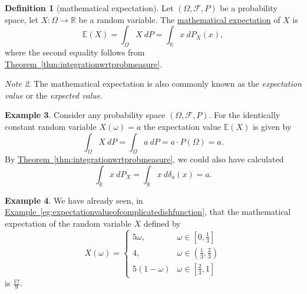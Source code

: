 \documentclass[a4paper,12pt]{scrreprt}
\newcommand{\R}{\mathbb{R}}
\newcommand{\defn}[1]{\ul{#1}}
\theoremstyle{definition}
\newtheorem{definition}{Definition}
\newtheorem{example}[definition]{Example}
\theoremstyle{plain}
\theoremstyle{remark}
\newtheorem{note}[definition]{Note}
\begin{document}
\begin{definition}[mathematical expectation]
  \label{def:mathematicalexpectation}
  Let $(\Omega,\mathcal{F}, P)$ be a probability space, let $X\colon \Omega \to \R$ be a random variable. The \defn{mathematical expectation} of $X$ is
  \begin{equation*}
    \mathbb{E}(X) = \int_{\Omega} X\ dP = \int_{\R} x\ dP_{X}(x),
  \end{equation*}
  where the second equality follows from \hyperref[thm:integrationwrtprobmeasure]{Theorem~\ref*{thm:integrationwrtprobmeasure}}.
\end{definition}

\begin{note}
  The mathematical expectation is also commonly known as the \emph{expectation value} or the \emph{expected value}.
\end{note}

\begin{example}
  Consider any probability space $(\Omega, \mathcal{F}, P)$. For the identically constant random variable $X(\omega) = a$ the expectation value $\mathbb{E}(X)$ is given by
  \begin{equation*}
    \int_{\Omega} X\ dP = \int_{\Omega} a\ dP = a\cdot P(\Omega) = a.
  \end{equation*}
  By \hyperref[thm:integrationwrtprobmeasure]{Theorem~\ref*{thm:integrationwrtprobmeasure}}, we could also have calculated
  \begin{equation*}
    \int_{\R} x\ dP_{X} = \int_{\R} x\ d\delta_{a}(x) = a.
  \end{equation*}
\end{example}

\begin{example}
  We have already seen, in \hyperref[eg:expectationvalueofcomplicatedishfunction]{Example~\ref*{eg:expectationvalueofcomplicatedishfunction}}, that the mathematical expectation of the random variable $X$ defined by
  \begin{equation*}
    X(\omega) =
    \begin{cases}
      5\omega, & \omega \in \left[ 0, \frac{1}{3} \right] \\
      4, & \omega \in \left( \frac{1}{3}, \frac{2}{3} \right) \\
      5(1-\omega) & \omega \in \left[ \frac{2}{3}, 1 \right]
    \end{cases}
  \end{equation*}
  is $\frac{17}{9}$.
\end{example}
\end{document}
